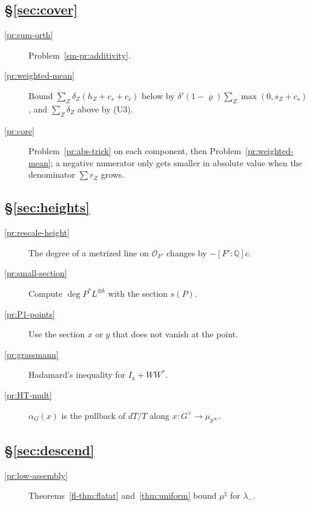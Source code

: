 \documentclass[reqno]{amsart}
\theoremstyle{definition}
\theoremstyle{plain}
\theoremstyle{remark}
\newcommand{\Q}{\mathbb Q}
\newcommand{\Oc}{\mathcal O}
\newcommand{\mus}{\mu^\sharp}
\begin{document}
\subsection*{\S\ref{sec:cover}}
\begin{description}
\item[\ref{pr:sum-orth}] Problem~\ref{sm-pr:additivity}.
\item[\ref{pr:weighted-mean}] Bound \(\sum_Z\delta_Z(h_Z + c_s + c_c)\) below by \(\delta'(1-\varrho)\sum_Z\max(0, s_Z + c_s)\), and \(\sum_Z\delta_Z\) above by (U3).
\item[\ref{pr:core}] Problem~\ref{pr:abs-trick} on each component, then Problem~\ref{pr:weighted-mean}; a negative numerator only gets smaller in absolute value when the denominator \(\sum r_Z\) grows.
\end{description}

\subsection*{\S\ref{sec:heights}}
\begin{description}
\item[\ref{pr:rescale-height}] The degree of a metrized line on \(\Oc_{F'}\) changes by \(-[F':\Q]c\).
\item[\ref{pr:small-section}] Compute \(\deg P^*L^{\otimes k}\) with the section \(s(P)\).
\item[\ref{pr:P1-points}] Use the section \(x\) or \(y\) that does not vanish at the point.
\item[\ref{pr:grassmann}] Hadamard's inequality for \(I_a + WW^*\).
\item[\ref{pr:HT-mult}] \(\alpha_G(x)\) is the pullback of \(dT/T\) along \(x \colon G^\vee \to \mu_{p^\infty}\).
\end{description}

\subsection*{\S\ref{sec:descend}}
\begin{description}
\item[\ref{pr:low-assembly}] Theorems~\ref{fl-thm:flatat} and~\ref{thm:uniform} bound \(\mus\) for \(\lambda_-\).
\end{description}
\end{document}
